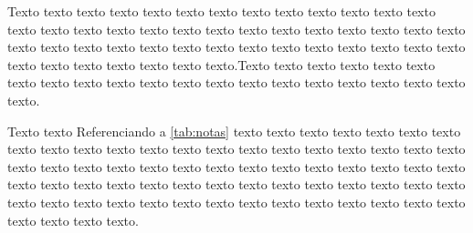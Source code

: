 Texto texto texto texto texto texto texto texto texto texto texto texto texto texto texto texto texto texto texto texto texto texto texto texto texto texto texto texto texto texto texto texto texto texto texto texto texto texto texto texto texto texto texto texto texto texto texto texto.Texto texto texto texto texto texto texto texto texto texto texto texto texto texto texto texto texto texto texto texto texto.

Texto texto  Referenciando a \autoref{tab:notas}  texto texto texto texto texto texto texto texto texto texto texto texto texto texto texto texto texto texto texto texto texto texto texto texto texto texto texto texto texto texto texto texto texto texto texto texto texto texto texto texto texto texto texto texto texto texto texto texto texto texto texto texto texto texto texto texto texto texto texto texto texto texto texto texto texto texto texto.
